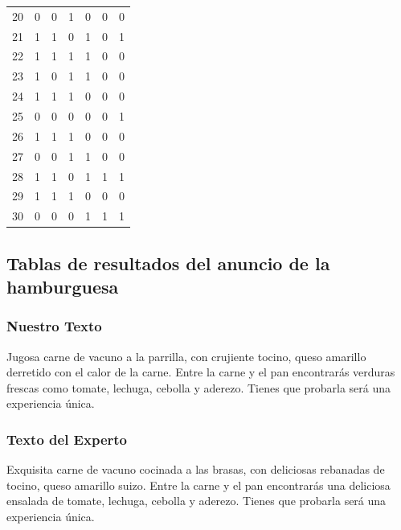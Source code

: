 \begin{table}
\begin{tabular}{|r|c|c|c|c|c|c|}
20 &         0 &         0 &         1 &         0 &         0 &         0 \\
21 &         1 &         1 &         0 &         1 &         0 &         1 \\
22 &         1 &         1 &         1 &         1 &         0 &         0 \\
23 &         1 &         0 &         1 &         1 &         0 &         0 \\
24 &         1 &         1 &         1 &         0 &         0 &         0 \\
25 &         0 &         0 &         0 &         0 &         0 &         1 \\
26 &         1 &         1 &         1 &         0 &         0 &         0 \\
27 &         0 &         0 &         1 &         1 &         0 &         0 \\
28 &         1 &         1 &         0 &         1 &         1 &         1 \\
29 &         1 &         1 &         1 &         0 &         0 &         0 \\
30 &         0 &         0 &         0 &         1 &         1 &         1 

\end{tabular}
\end{table}



\subsection{Tablas de resultados del anuncio de la hamburguesa}


\subsubsection{Nuestro Texto}

Jugosa carne de vacuno  a la parrilla, con crujiente tocino, queso amarillo  derretido con el calor de la carne. Entre la carne y el pan encontrarás verduras frescas como tomate, lechuga, cebolla y aderezo. Tienes que probarla será una experiencia única.

\subsubsection{Texto del Experto}

Exquisita carne de vacuno  cocinada a las brasas, con deliciosas rebanadas de tocino, queso amarillo suizo. Entre la carne y el pan encontrarás una deliciosa ensalada de tomate, lechuga, cebolla y aderezo. Tienes que probarla será una experiencia única.

